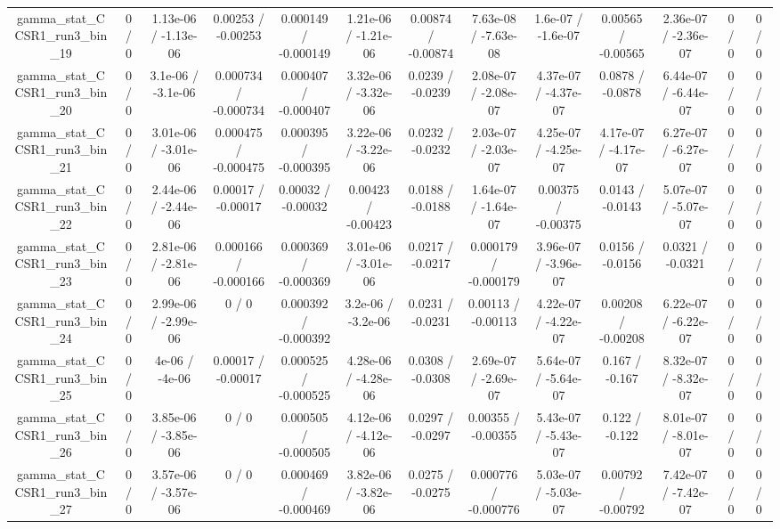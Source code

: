 \documentclass[10pt]{article}
\begin{document}
\begin{table}[htbp]
\begin{center}
\begin{tabular}{|c|c|c|c|c|c|c|c|c|c|c|c|c|}
  gamma_stat_CCSR1_run3_bin_19 & 0 / 0 & 1.13e-06 / -1.13e-06 & 0.00253 / -0.00253 & 0.000149 / -0.000149 & 1.21e-06 / -1.21e-06 & 0.00874 / -0.00874 & 7.63e-08 / -7.63e-08 & 1.6e-07 / -1.6e-07 & 0.00565 / -0.00565 & 2.36e-07 / -2.36e-07 & 0 / 0 & 0 / 0 \\ 
  gamma_stat_CCSR1_run3_bin_20 & 0 / 0 & 3.1e-06 / -3.1e-06 & 0.000734 / -0.000734 & 0.000407 / -0.000407 & 3.32e-06 / -3.32e-06 & 0.0239 / -0.0239 & 2.08e-07 / -2.08e-07 & 4.37e-07 / -4.37e-07 & 0.0878 / -0.0878 & 6.44e-07 / -6.44e-07 & 0 / 0 & 0 / 0 \\ 
  gamma_stat_CCSR1_run3_bin_21 & 0 / 0 & 3.01e-06 / -3.01e-06 & 0.000475 / -0.000475 & 0.000395 / -0.000395 & 3.22e-06 / -3.22e-06 & 0.0232 / -0.0232 & 2.03e-07 / -2.03e-07 & 4.25e-07 / -4.25e-07 & 4.17e-07 / -4.17e-07 & 6.27e-07 / -6.27e-07 & 0 / 0 & 0 / 0 \\ 
  gamma_stat_CCSR1_run3_bin_22 & 0 / 0 & 2.44e-06 / -2.44e-06 & 0.00017 / -0.00017 & 0.00032 / -0.00032 & 0.00423 / -0.00423 & 0.0188 / -0.0188 & 1.64e-07 / -1.64e-07 & 0.00375 / -0.00375 & 0.0143 / -0.0143 & 5.07e-07 / -5.07e-07 & 0 / 0 & 0 / 0 \\ 
  gamma_stat_CCSR1_run3_bin_23 & 0 / 0 & 2.81e-06 / -2.81e-06 & 0.000166 / -0.000166 & 0.000369 / -0.000369 & 3.01e-06 / -3.01e-06 & 0.0217 / -0.0217 & 0.000179 / -0.000179 & 3.96e-07 / -3.96e-07 & 0.0156 / -0.0156 & 0.0321 / -0.0321 & 0 / 0 & 0 / 0 \\ 
  gamma_stat_CCSR1_run3_bin_24 & 0 / 0 & 2.99e-06 / -2.99e-06 & 0 / 0 & 0.000392 / -0.000392 & 3.2e-06 / -3.2e-06 & 0.0231 / -0.0231 & 0.00113 / -0.00113 & 4.22e-07 / -4.22e-07 & 0.00208 / -0.00208 & 6.22e-07 / -6.22e-07 & 0 / 0 & 0 / 0 \\ 
  gamma_stat_CCSR1_run3_bin_25 & 0 / 0 & 4e-06 / -4e-06 & 0.00017 / -0.00017 & 0.000525 / -0.000525 & 4.28e-06 / -4.28e-06 & 0.0308 / -0.0308 & 2.69e-07 / -2.69e-07 & 5.64e-07 / -5.64e-07 & 0.167 / -0.167 & 8.32e-07 / -8.32e-07 & 0 / 0 & 0 / 0 \\ 
  gamma_stat_CCSR1_run3_bin_26 & 0 / 0 & 3.85e-06 / -3.85e-06 & 0 / 0 & 0.000505 / -0.000505 & 4.12e-06 / -4.12e-06 & 0.0297 / -0.0297 & 0.00355 / -0.00355 & 5.43e-07 / -5.43e-07 & 0.122 / -0.122 & 8.01e-07 / -8.01e-07 & 0 / 0 & 0 / 0 \\ 
  gamma_stat_CCSR1_run3_bin_27 & 0 / 0 & 3.57e-06 / -3.57e-06 & 0 / 0 & 0.000469 / -0.000469 & 3.82e-06 / -3.82e-06 & 0.0275 / -0.0275 & 0.000776 / -0.000776 & 5.03e-07 / -5.03e-07 & 0.00792 / -0.00792 & 7.42e-07 / -7.42e-07 & 0 / 0 & 0 / 0 \\ 

\end{tabular}
\end{center}
\end{table}
\end{document}
